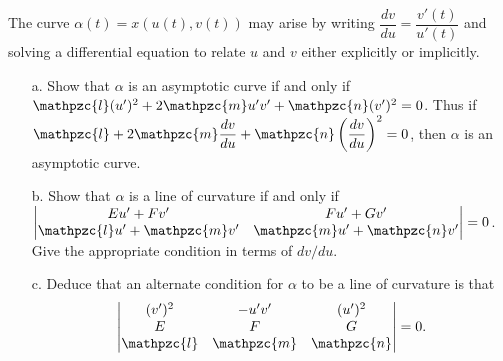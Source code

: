 \documentclass[Shifrin_Solutions_Spring_2015]{subfiles}
\begin{document}
\begin{exercise}
The curve $\alpha(t) = x(u(t), v(t))$ may arise by writing $\dfrac{dv}{du} = \dfrac{v'(t)}{u'(t)}$ and solving a differential equation to relate $u$ and $v$ either explicitly or implicitly.
\begin{itemize}
\item[a.] Show that $\alpha$ is an asymptotic curve if and only if $\mathpzc{l}(u')^2 + 2\mathpzc{m}u' v' + \mathpzc{n}(v')^2 = 0$. Thus if $\mathpzc{l} + 2\mathpzc{m}\dfrac{dv}{du} + \mathpzc{n}\left(\dfrac{dv}{du}\right)^2 = 0$, then $\alpha$ is an asymptotic curve.

\item[b.] Show that $\alpha$ is a line of curvature if and only if $\begin{vmatrix}
Eu' + Fv' & Fu'+Gv' \\ \mathpzc{l}u' + \mathpzc{m}v' & \mathpzc{m}u' + \mathpzc{n}v'
\end{vmatrix} =0$. Give the appropriate condition in terms of $dv/du$.

\item[c.] Deduce that an alternate condition for $\alpha$ to be a line of curvature is that
\[
\begin{vmatrix}
(v')^2 & -u'v' & (u')^2 \\
E & F & G \\
\mathpzc{l} & \mathpzc{m}  & \mathpzc{n}
\end{vmatrix}
=0.
\]
\end{itemize}
\end{exercise}
\end{document}
